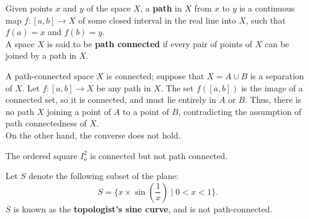 \begin{definition}
Given points $x$ and $y$ of the space $X$, a \textbf{path} in $X$ from $x$ to $y$
is a continuous map $f\colon [a, b] \rightarrow X$ of some closed interval in the real line into $X$, such
that $f(a) = x$ and $f(b) = y$. \\

A space $X$ is said to be \textbf{path connected} if every pair of points of $X$ can be joined by a path in $X$.
\end{definition}

\begin{remark}
A path-connected space $X$ is connected; suppose that $X = A \cup B$ is a separation of $X$. Let $f\colon [a, b] \rightarrow X$ be any path in $X$. 
The set $f([a, b])$ is the image of a connected set, so it is connected, and must lie entirely in $A$ or $B$. Thus, there is no path $X$
joining a point of $A$ to a point of $B$, contradicting the assumption of path connectedness of $X$. \\

On the other hand, the converse does not hold.
\end{remark}

\begin{eg}
The ordered square $I_o^2$ is connected but not path connected.
\end{eg}

\begin{eg}
Let $S$ denote the following subset of the plane:
\[
    S = \{ x \times \sin \left( \frac{1}{x} \right) \mid 0 < x < 1\}. 
\]
$\overline{S}$ is known as the \textbf{topologist's sine curve}, and is not path-connected.
\end{eg}